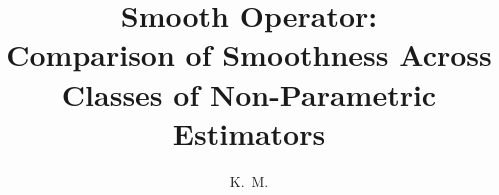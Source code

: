 \documentclass[defaultstyle,11pt]{thesis}
\title{Smooth Operator:\\ Comparison of Smoothness Across Classes of Non-Parametric Estimators}
\author{K.~M.}{McLean}
\begin{document}




\nocite{*}		%

\appendix


\end{document}
